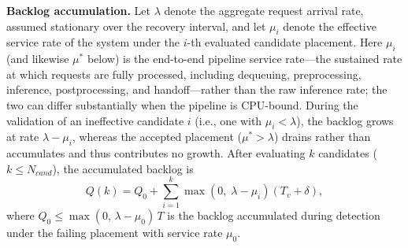 \documentclass[conference]{IEEEtran}
\begin{document}
\noindent\textbf{Backlog accumulation.}
Let $\lambda$ denote the aggregate request arrival rate, assumed stationary over the recovery interval, and let $\mu_i$ denote the effective service rate of the system under the $i$-th evaluated candidate placement. \textcolor{navyblue}{Here $\mu_i$ (and likewise $\mu^{\ast}$ below) is the end-to-end pipeline service rate---the sustained rate at which requests are fully processed, including dequeuing, preprocessing, inference, postprocessing, and handoff---rather than the raw inference rate; the two can differ substantially when the pipeline is CPU-bound.} During the validation of an ineffective candidate $i$ (i.e., one with $\mu_i < \lambda$), the backlog grows at rate $\lambda - \mu_i$, whereas the accepted placement ($\mu^{\ast} > \lambda$) drains rather than accumulates and thus contributes no growth. After evaluating $k$ candidates ($k \le N_{cand}$), the accumulated backlog is
\begin{equation}
Q(k) = Q_0 + \sum_{i=1}^{k} \max\!\left(0,\; \lambda - \mu_i\right)\left(T_v + \delta\right),
\label{eq:backlog}
\end{equation}
where $Q_0 \le \max(0,\, \lambda - \mu_0)\, T$ is the backlog accumulated during detection under the failing placement with service rate $\mu_0$.
\end{document}
